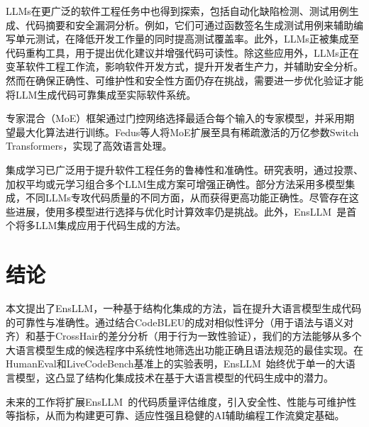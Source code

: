 \documentclass{article}
\newcommand{\tool}{EnsLLM}
\begin{document}
\begin{CJK*}{UTF8}{gbsn}
LLMs在更广泛的软件工程任务中也得到探索，包括自动化缺陷检测、测试用例生成、代码摘要和安全漏洞分析\cite{rahul2023llm, mueller2023automated}。例如，它们可通过函数签名生成测试用例来辅助编写单元测试，在降低开发工作量的同时提高测试覆盖率\cite{mueller2023automated}。此外，LLMs正被集成至代码重构工具，用于提出优化建议并增强代码可读性\cite{zhao2022large}。除这些应用外，LLMs正在变革软件工程工作流，影响软件开发方式\cite{imai2022github, liu2023fill}，提升开发者生产力\cite{dakhel2023github, ziegler2022productivity}，并辅助安全分析\cite{pearce2023examining}。然而在确保正确性、可维护性和安全性方面仍存在挑战，需要进一步优化验证才能将LLM生成代码可靠集成至实际软件系统。

专家混合（MoE）框架\cite{jordan1994hierarchical}通过门控网络选择最适合每个输入的专家模型，并采用期望最大化算法进行训练。Fedus等人\cite{fedus2021switch}将MoE扩展至具有稀疏激活的万亿参数Switch Transformers，实现了高效语言处理。

集成学习已广泛用于提升软件工程任务的鲁棒性和准确性。研究表明，通过投票、加权平均或元学习组合多个LLM生成方案可增强正确性\cite{zhang2023ensemble, wang2023code}。部分方法采用多模型集成，不同LLMs专攻代码质量的不同方面，从而获得更高功能正确性\cite{wang2023code}。尽管存在这些进展，使用多模型进行选择与优化时计算效率仍是挑战。此外，\tool\ 是首个将多LLM集成应用于代码生成的方法。
\section{结论}

本文提出了\tool，一种基于结构化集成的方法，旨在提升大语言模型生成代码的可靠性与准确性。通过结合CodeBLEU的成对相似性评分（用于语法与语义对齐）和基于CrossHair的差分分析（用于行为一致性验证），我们的方法能够从多个大语言模型生成的候选程序中系统性地筛选出功能正确且语法规范的最佳实现。在HumanEval和LiveCodeBench基准上的实验表明，\tool\ 始终优于单一的大语言模型，这凸显了结构化集成技术在基于大语言模型的代码生成中的潜力。

未来的工作将扩展\tool\ 的代码质量评估维度，引入安全性、性能与可维护性等指标，从而为构建更可靠、适应性强且稳健的AI辅助编程工作流奠定基础。




\end{CJK*}
\end{document}
